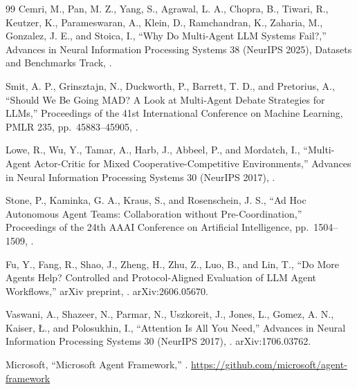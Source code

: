 \documentclass[11pt,a4paper]{article}
\begin{document}
\begin{thebibliography}{99}
\bibspace
{}
Cemri, M., Pan, M. Z., Yang, S., Agrawal, L. A., Chopra, B., Tiwari, R., Keutzer, K., Parameswaran, A., Klein, D., Ramchandran, K., Zaharia, M., Gonzalez, J. E., and Stoica, I.,
\newblock ``{Why Do Multi-Agent LLM Systems Fail?},''
\newblock Advances in Neural Information Processing Systems 38 (NeurIPS 2025), Datasets and Benchmarks Track,
.

\bibspace
{}
Smit, A. P., Grinsztajn, N., Duckworth, P., Barrett, T. D., and Pretorius, A.,
\newblock ``{Should We Be Going MAD? A Look at Multi-Agent Debate Strategies for LLMs},''
\newblock Proceedings of the 41st International Conference on Machine Learning, PMLR 235, pp.~45883--45905,
.

\bibspace
{}
Lowe, R., Wu, Y., Tamar, A., Harb, J., Abbeel, P., and Mordatch, I.,
\newblock ``{Multi-Agent Actor-Critic for Mixed Cooperative-Competitive Environments},''
\newblock Advances in Neural Information Processing Systems 30 (NeurIPS 2017),
.

\bibspace
{}
Stone, P., Kaminka, G. A., Kraus, S., and Rosenschein, J. S.,
\newblock ``{Ad Hoc Autonomous Agent Teams: Collaboration without Pre-Coordination},''
\newblock Proceedings of the 24th AAAI Conference on Artificial Intelligence, pp.~1504--1509,
.

\bibspace
{}
Fu, Y., Fang, R., Shao, J., Zheng, H., Zhu, Z., Luo, B., and Lin, T.,
\newblock ``{Do More Agents Help? Controlled and Protocol-Aligned Evaluation of LLM Agent Workflows},''
\newblock arXiv preprint,
.
\newblock arXiv:2606.05670.

\bibspace
{}
Vaswani, A., Shazeer, N., Parmar, N., Uszkoreit, J., Jones, L., Gomez, A. N., Kaiser, {\L}., and Polosukhin, I.,
\newblock ``{Attention Is All You Need},''
\newblock Advances in Neural Information Processing Systems 30 (NeurIPS 2017),
.
\newblock arXiv:1706.03762.

\bibspace
{}
Microsoft,
\newblock ``{Microsoft Agent Framework},''
.
\newblock \url{https://github.com/microsoft/agent-framework}

\end{thebibliography}
%

\newpage
%
%
\appendix
\end{document}
